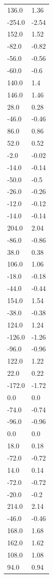 \begin{longtable}{ll}
136.0 & 1.36 \\
-254.0 & -2.54 \\
152.0 & 1.52 \\
-82.0 & -0.82 \\
-56.0 & -0.56 \\
-60.0 & -0.6 \\
140.0 & 1.4 \\
146.0 & 1.46 \\
28.0 & 0.28 \\
-46.0 & -0.46 \\
86.0 & 0.86 \\
52.0 & 0.52 \\
-2.0 & -0.02 \\
-14.0 & -0.14 \\
-50.0 & -0.5 \\
-26.0 & -0.26 \\
-12.0 & -0.12 \\
-14.0 & -0.14 \\
204.0 & 2.04 \\
-86.0 & -0.86 \\
38.0 & 0.38 \\
106.0 & 1.06 \\
-18.0 & -0.18 \\
-44.0 & -0.44 \\
154.0 & 1.54 \\
-38.0 & -0.38 \\
124.0 & 1.24 \\
-126.0 & -1.26 \\
-96.0 & -0.96 \\
122.0 & 1.22 \\
22.0 & 0.22 \\
-172.0 & -1.72 \\
0.0 & 0.0 \\
-74.0 & -0.74 \\
-96.0 & -0.96 \\
0.0 & 0.0 \\
18.0 & 0.18 \\
-72.0 & -0.72 \\
14.0 & 0.14 \\
-72.0 & -0.72 \\
-20.0 & -0.2 \\
214.0 & 2.14 \\
-46.0 & -0.46 \\
168.0 & 1.68 \\
162.0 & 1.62 \\
108.0 & 1.08 \\
94.0 & 0.94 \\

\end{longtable}
